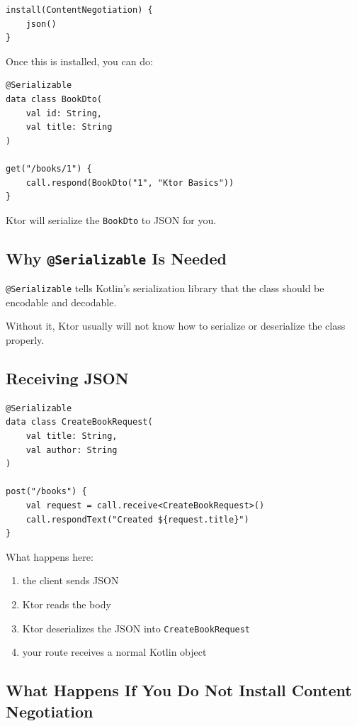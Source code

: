 \documentclass[11pt,a4paper]{article}
\begin{document}
\begin{lstlisting}[style=kazekotlin]
install(ContentNegotiation) {
    json()
}
\end{lstlisting}

Once this is installed, you can do:

\begin{lstlisting}[style=kazekotlin]
@Serializable
data class BookDto(
    val id: String,
    val title: String
)

get("/books/1") {
    call.respond(BookDto("1", "Ktor Basics"))
}
\end{lstlisting}

Ktor will serialize the \texttt{BookDto} to JSON for you.

\subsection{Why \texttt{@Serializable} Is Needed}

\texttt{@Serializable} tells Kotlin's serialization library that the class should be encodable and decodable.

Without it, Ktor usually will not know how to serialize or deserialize the class properly.

\subsection{Receiving JSON}

\begin{lstlisting}[style=kazekotlin]
@Serializable
data class CreateBookRequest(
    val title: String,
    val author: String
)

post("/books") {
    val request = call.receive<CreateBookRequest>()
    call.respondText("Created ${request.title}")
}
\end{lstlisting}

What happens here:
\begin{enumerate}
    \item the client sends JSON
    \item Ktor reads the body
    \item Ktor deserializes the JSON into \texttt{CreateBookRequest}
    \item your route receives a normal Kotlin object
\end{enumerate}

\subsection{What Happens If You Do Not Install Content Negotiation}
\end{document}
